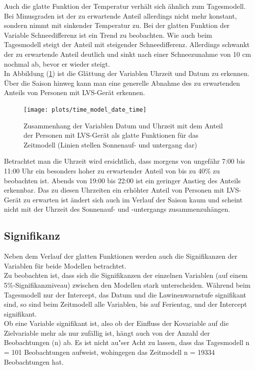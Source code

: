 \documentclass[12pt]{scrreprt}
\begin{document}
Auch die glatte Funktion der Temperatur verhält sich ähnlich zum Tagesmodell. Bei Minusgraden ist der zu erwartende Anteil allerdings nicht mehr konstant, sondern nimmt mit sinkender Temperatur zu. Bei der glatten Funktion der Variable Schneedifferenz ist ein Trend zu beobachten. Wie auch beim Tagesmodell steigt der Anteil mit steigender Schneedifferenz. Allerdings schwankt der zu erwartende Anteil deutlich und sinkt nach einer Schneezunahme von 10 cm nochmal ab, bevor er wieder steigt. \\
In Abbildung (\ref{pic:time_model_date_time}) ist die Glättung der Variablen Uhrzeit und Datum zu erkennen. Über die Saison hinweg kann man eine generelle Abnahme des zu erwartenden Anteils von Personen mit LVS-Gerät erkennen.
\begin{figure}[H]
	\centering
	\texttt{[image: plots/time\_model\_date\_time]}
	\caption{Zusammenhang der Variablen Datum und Uhrzeit mit dem Anteil der Personen mit LVS-Gerät als glatte Funktionen für das Zeitmodell (Linien stellen Sonnenauf- und untergang dar)}
	\label{pic:time_model_date_time}	
\end{figure}
\noindent Betrachtet man die Uhrzeit wird ersichtlich, dass morgens von ungefähr 7:00 bis 11:00 Uhr ein besonders hoher zu erwartender Anteil von bis zu 40\% zu beobachten ist. Abends von 19:00 bis 22:00 ist ein geringer Anstieg des Anteils erkennbar. Das zu diesen Uhrzeiten ein erhöhter Anteil von Personen mit LVS-Gerät zu erwarten ist ändert sich auch im Verlauf der Saison kaum und scheint nicht mit der Uhrzeit des Sonnenauf- und -untergangs zusammenzuhängen.

\subsection{Signifikanz}
Neben dem Verlauf der glatten Funktionen werden auch die Signifikanzen der Variablen für beide Modellen betrachtet. \\
Zu beobachten ist, dass sich die Signifikanzen der einzelnen Variablen (auf einem 5\%-Signifikanzniveau) zwischen den Modellen stark unterscheiden. Während beim Tagesmodell nur der Intercept, das Datum und die Lawinenwarnstufe signifikant sind, so sind beim Zeitmodell alle Variablen, bis auf Ferientag, und der Intercept signifikant. \\
Ob eine Variable signifikant ist, also ob der Einfluss der Kovariable auf die Zielvariable mehr als nur zufällig ist, hängt auch von der Anzahl der Beobachtungen (n) ab. Es ist nicht au"ser Acht zu lassen, dass das Tagesmodell n = 101 Beobachtungen aufweist, wohingegen das Zeitmodell n = 19334 Beobachtungen hat.
\end{document}
